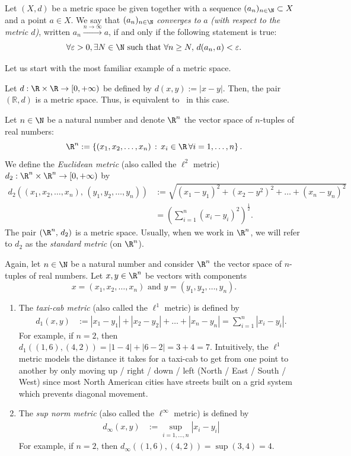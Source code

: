 \begin{defn}
	\label{defn:cvg_metric}
Let $(X,d)$ be a metric space be given together with a sequence $(a_n)_{n\in\N}\subset X$ and a point $a\in X$. We say that $(a_n)_{n\in\N}$ \textit{converges to }$a$ \textit{(with respect to the metric $d$)}, written $a_n\overset{n\to \infty}{\to} a$, if and only if the following statement is true:
\[
\forall \varepsilon>0,\exists N\in\N\text{ such that }\forall n\ge N, \, d(a_n,a)<\varepsilon.
\]
\end{defn}
Let us start with the most familiar example of a metric space.
\begin{eg}
\label{eg:real_metric}
Let $d:\R\times\R\to [0,+\infty)$ be defined by $d(x,y) := |x-y|$. Then, the pair $(\mathbb{R}, d)$ is a metric space. Thus,  is equivalent to~ in this case.
\end{eg}
\begin{eg}
Let $n\in\N$ be a natural number and denote $\R^n$ the vector space of $n$-tuples of real numbers:
\[
\R^n := \left\{
(x_1,x_2,\dots, x_n)\, : \, x_i\in\R \, \forall i=1,\dots, n
\right\}.
\]
We define the \textit{Euclidean metric} (also called the $\ell^2$ metric) $d_2:\R^n\times \R^n\to [0,+\infty)$ by
\begin{align*}
d_2((x_1,x_2,\dots, x_n),\,(y_1,y_2,\dots, y_n))&:= \sqrt{(x_1-y_1)^2 + (x_2-y^2)^2 + \dots + (x_n-y_n)^2} 	\\
&= \left(\sum_{i=1}^n (x_i-y_i)^2\right)^\frac{1}{2}.
\end{align*}
The pair $(\R^n,\, d_2)$ is a metric space. Usually, when we work in $\R^n$, we will refer to $d_2$ as the \textit{standard metric} (on $\R^n$).
\end{eg}
\begin{eg}
Again, let $n\in\N$ be a natural number and consider $\R^n$ the vector space of $n$-tuples of real numbers. Let $x,y\in\R^n$ be vectors with components
\[
x=(x_1,x_2,\dots, x_n)\text{ and }y = (y_1,y_2,\dots, y_n).
\]
\begin{enumerate}
	\item The \textit{taxi-cab metric} (also called the $\ell^1$ metric) is defined by
	\begin{align*}
	d_1(x,y) 	&:= |x_1-y_1| + |x_2-y_2| + \dots + |x_n - y_n| = \sum_{i=1}^n|x_i-y_i|.
	\end{align*}
	For example, if $n=2$, then $d_1((1,6),(4,2)) = |1 - 4| + |6 - 2| = 3 + 4 = 7$. Intuitively, the $\ell^1$ metric models the distance it takes for a taxi-cab to get from one point to another by only moving up / right / down / left (North / East / South / West) since most North American cities have streets built on a grid system which prevents diagonal movement.
	\item The \textit{sup norm metric} (also called the $\ell^\infty$ metric) is defined by
	\begin{align*}
		d_\infty(x,y) 	&:= \sup_{i=1,\dots, n}|x_i-y_i|
	\end{align*}
	For example, if $n=2$, then $d_\infty((1,6),(4,2)) = \sup (3,4) = 4$.
\end{enumerate}
\end{eg}
